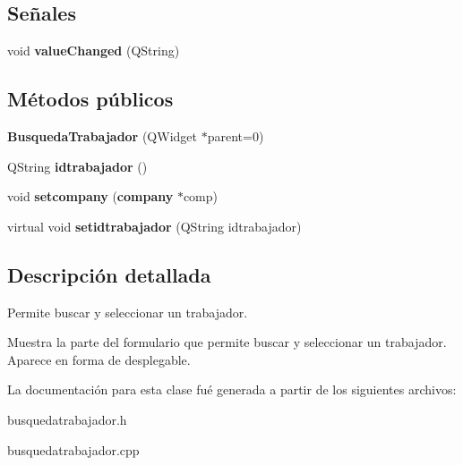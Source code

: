\subsection*{Se\~{n}ales}
\begin{CompactItemize}
\item 
void {\bf value\-Changed} (QString)\label{classBusquedaTrabajador_l0}

\end{CompactItemize}
\subsection*{M\'{e}todos p\'{u}blicos}
\begin{CompactItemize}
\item 
{\bf Busqueda\-Trabajador} (QWidget $\ast$parent=0)\label{classBusquedaTrabajador_a0}

\item 
QString {\bf idtrabajador} ()\label{classBusquedaTrabajador_a1}

\item 
void {\bf setcompany} ({\bf company} $\ast$comp)\label{classBusquedaTrabajador_a2}

\item 
virtual void {\bf setidtrabajador} (QString idtrabajador)\label{classBusquedaTrabajador_a3}

\end{CompactItemize}


\subsection{Descripci\'{o}n detallada}
Permite buscar y seleccionar un trabajador. 

Muestra la parte del formulario que permite buscar y seleccionar un trabajador. Aparece en forma de desplegable. 



La documentaci\'{o}n para esta clase fu\'{e} generada a partir de los siguientes archivos:\begin{CompactItemize}
\item 
busquedatrabajador.h\item 
busquedatrabajador.cpp\end{CompactItemize}
